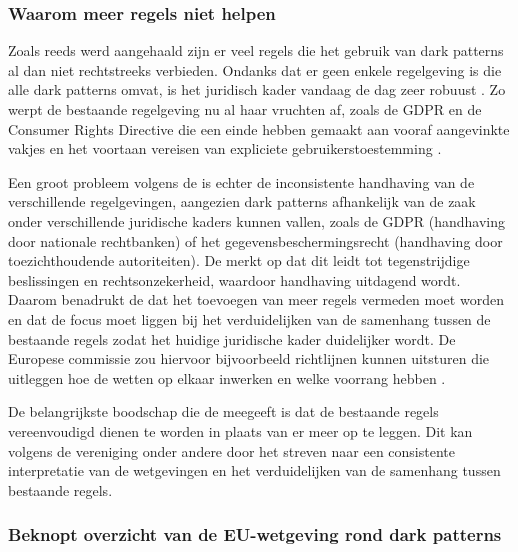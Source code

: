 \subsubsection{Waarom meer regels niet helpen}

Zoals reeds werd aangehaald zijn er veel regels die het gebruik van dark patterns al dan niet rechtstreeks verbieden. Ondanks dat er geen enkele regelgeving is die alle dark patterns omvat, is het juridisch kader vandaag de dag zeer robuust \autocite{ETA2025}. Zo werpt de bestaande regelgeving nu al haar vruchten af, zoals de GDPR en de Consumer Rights Directive die een einde hebben gemaakt aan vooraf aangevinkte vakjes en het voortaan vereisen van expliciete gebruikerstoestemming \autocite{ETA2025}. 

\vspace{0.5em}

Een groot probleem volgens de \textcite{ETA2025} is echter de inconsistente handhaving van de verschillende regelgevingen, aangezien dark patterns afhankelijk van de zaak onder verschillende juridische kaders kunnen vallen, zoals de GDPR (handhaving door nationale rechtbanken) of het gegevensbeschermingsrecht (handhaving door toezichthoudende autoriteiten). De \textcite{ETA2025} merkt op dat dit leidt tot tegenstrijdige beslissingen en rechtsonzekerheid, waardoor handhaving uitdagend wordt. Daarom benadrukt de \textcite{ETA2025} dat het toevoegen van meer regels vermeden moet worden en dat de focus moet liggen bij het verduidelijken van de samenhang tussen de bestaande regels zodat het huidige juridische kader duidelijker wordt. De Europese commissie zou hiervoor bijvoorbeeld richtlijnen kunnen uitsturen die uitleggen hoe de wetten op elkaar inwerken en welke voorrang hebben \autocite{ETA2025}. 

\vspace{0.5em}

De belangrijkste boodschap die de \textcite{ETA2025} meegeeft is dat de bestaande regels vereenvoudigd dienen te worden in plaats van er meer op te leggen. Dit kan volgens de vereniging onder andere door het streven naar een consistente interpretatie van de wetgevingen en het verduidelijken van de samenhang tussen bestaande regels.

\vspace{1em}

\subsubsection{Beknopt overzicht van de EU-wetgeving rond dark patterns}

